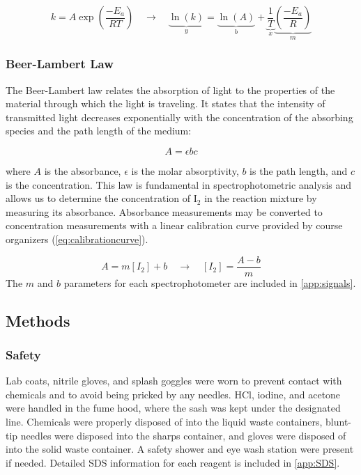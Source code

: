 \documentclass{article}
\begin{document}
\begin{equation}
    k = A \exp \left( \frac{- E_a}{RT}\right) \quad \longrightarrow  \quad \underbrace{\ln (k)}_y = \underbrace{\ln (A)}_b + \underbrace{\frac{1}{T}}_x \underbrace{\left(\frac{-E_a}{R} \right)}_m \label{eq:arrhenius_for_EaA}
\end{equation}

\subsubsection{Beer-Lambert Law}

The Beer-Lambert law \autocite{swinehart_beerlambert_1962} relates the absorption of light to the properties of the material through which the light is traveling. It states that the intensity of transmitted light decreases exponentially with the concentration of the absorbing species and the path length of the medium:

\begin{equation}
A = \epsilon b c
\end{equation}

where $A$ is the absorbance, $\epsilon$ is the molar absorptivity, $b$ is the path length, and $c$ is the concentration. This law is fundamental in spectrophotometric analysis and allows us to determine the concentration of $\mathrm{I_2}$ in the reaction mixture by measuring its absorbance. Absorbance measurements may be converted to concentration measurements with a linear calibration curve provided by course organizers (\cref{eq:calibrationcurve}). 

\begin{equation}
    A = m [I_2] + b \quad \longrightarrow \quad [I_2] = \frac{A-b}{m} \label{eq:calibrationcurve}
\end{equation}
\noindent
The $m$ and $b$ parameters for each spectrophotometer are included in \cref{app:signals}. 

\subsection{Methods}

\subsubsection{Safety}

Lab coats, nitrile gloves, and splash goggles were worn to prevent contact with chemicals and to avoid being pricked by any needles. HCl, iodine, and acetone were handled in the fume hood, where the sash was kept under the designated line. Chemicals were properly disposed of into the liquid waste containers, blunt-tip needles were disposed into the sharps container, and gloves were disposed of into the solid waste container. A safety shower and eye wash station were present if needed. Detailed SDS information for each reagent is included in \cref{app:SDS}.
\end{document}
